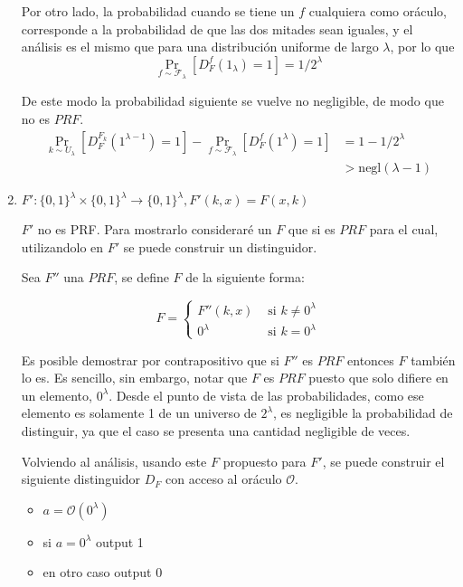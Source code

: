 \documentclass[twoside]{tareas}
\begin{document}
\begin{enumerate}
    Por otro lado, la probabilidad cuando se tiene un $f$ cualquiera como oráculo, corresponde a la probabilidad de que las dos mitades sean iguales, y el análisis es el mismo que para una distribución uniforme de largo $\lambda$, por lo que
    $$\Pr_{f \sim \mathcal{F}_\lambda}[D_F^{f}(1_\lambda) = 1] = 1/2^{\lambda}$$

    De este modo la probabilidad siguiente se vuelve no negligible, de modo que no es $PRF$.
    \begin{align*}
        \Pr_{k \sim U_\lambda}[D_F^{F_k}(1^{\lambda-1}) = 1] - \Pr_{f \sim \mathcal{F}_\lambda}[D_F^{f}(1^\lambda) = 1] &= 1 - 1/2^{\lambda}\\
        &> \text{negl}(\lambda - 1)
    \end{align*}

    \item {\boldmath$F': \{0, 1\}^{\lambda} \times \{0, 1\}^{\lambda} \rightarrow \{0, 1\}^{\lambda}, F'(k, x) = F (x,k)$}

    $F'$ no es PRF. Para mostrarlo consideraré un $F$ que si es $PRF$ para el cual, utilizandolo en $F'$ se puede construir un distinguidor.

    Sea $F''$ una $PRF$, se define $F$ de la siguiente forma:

    $$F = \begin{cases} F''(k, x) & \text{ si } k \neq 0^{\lambda} \\ 0^{\lambda} & \text{ si } k = 0^{\lambda} \end{cases}$$

    Es posible demostrar por contrapositivo que si $F''$ es $PRF$ entonces $F$ también lo es. Es sencillo, sin embargo, notar que $F$ es $PRF$ puesto que solo difiere en un elemento, $0^{\lambda}$. Desde el punto de vista de las probabilidades, como ese elemento es solamente 1 de un universo de $2^{\lambda}$, es negligible la probabilidad de distinguir, ya que el caso se presenta una cantidad negligible de veces.

    Volviendo al análisis, usando este $F$ propuesto para $F'$, se puede construir el siguiente distinguidor $D_F$ con acceso al oráculo $\mathcal{O}$.

    \begin{itemize}
        \item $a = \mathcal{O}(0^{\lambda})$
        \item si $a = 0^{\lambda}$ output 1
        \item en otro caso output 0
    \end{itemize}


\end{enumerate}
\end{document}
